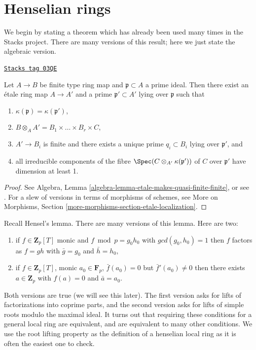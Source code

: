 \section{Henselian rings}
\label{etale-cohomology-section-henselian-ring}
We begin by stating a theorem which has already been used many times
in the Stacks project. There are many versions of this result; here we
just state the algebraic version.

\begin{theorem}
\label{etale-cohomology-theorem-quasi-finite-etale-locally}
\href{https://stacks.math.columbia.edu/tag/03QE}{\texttt{Stacks tag 03QE}}

Let $A\to B$ be finite type ring map and $\mathfrak p \subset A$ a prime
ideal. Then there exist an \'etale ring map $A \to A'$ and a prime
$\mathfrak p' \subset A'$ lying over $\mathfrak p$ such that
\begin{enumerate}
\item
$\kappa(\mathfrak p) = \kappa(\mathfrak p')$,
\item
$ B \otimes_A A' = B_1\times \ldots \times B_r \times C$,
\item
$ A'\to B_i$ is finite and there exists a unique prime $q_i\subset B_i$ lying
over $\mathfrak p'$, and
\item all irreducible components of the fibre
$\Spec(C \otimes_{A'} \kappa(\mathfrak p'))$ of $C$ over $\mathfrak p'$
have dimension at least 1.
\end{enumerate}
\end{theorem}

\begin{proof}
See Algebra, Lemma \ref{algebra-lemma-etale-makes-quasi-finite-finite}, or
see \cite[Th\'eor\`eme 18.12.1]{EGA4}. For a slew of versions in terms of
morphisms of schemes, see
More on Morphisms, Section \ref{more-morphisms-section-etale-localization}.
\end{proof}

Recall Hensel's lemma.
There are many versions of this lemma. Here are two:
\begin{enumerate}
\item[(f)] if $f\in \mathbf{Z}_p[T]$ monic and
$f \bmod p = g_0 h_0$ with $gcd(g_0, h_0) = 1$ then $f$ factors
as $f = gh$ with $\bar g = g_0$ and $\bar h = h_0$,
\item[(r)] if $f \in \mathbf{Z}_p[T]$, monic $a_0 \in \mathbf{F}_p$,
$\bar f(a_0) =0$ but $\bar f'(a_0) \neq 0$
then there exists $a \in \mathbf{Z}_p$ with
$f(a) = 0$ and $\bar a = a_0$.
\end{enumerate}
Both versions are true (we will see this later). The first version
asks for lifts of factorizations into coprime parts,
and the second version asks for lifts of simple roots
modulo the maximal ideal. It turns out that requiring
these conditions for a general local ring are equivalent, and are
equivalent to many other conditions. We use the root lifting
property as the definition of a henselian local ring as it is
often the easiest one to check.

